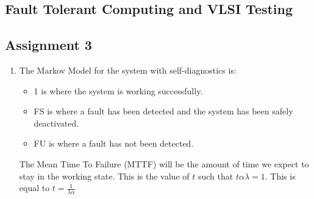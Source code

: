 \documentclass[a4paper,12pt]{article}
\begin{document}
    \begin{center}
        \section*{Fault Tolerant Computing and VLSI Testing}
        \subsection*{Assignment 3}
    \end{center}

    \begin{enumerate}

        \item The Markov Model for the system with self-diagnostics is:


            \begin{itemize}
                \item 1 is where the system is working successfully.
                \item FS is where a fault has been detected and the system has been safely deactivated.
                \item FU is where a fault has not been detected.
            \end{itemize}

            The Mean Time To Failure (MTTF) will be the amount of time we expect to stay in the working state. This is the value of $t$ such that $t\alpha\lambda = 1$. This is equal to $t = \frac{1}{\lambda\alpha}$


\end{enumerate}
\end{document}

